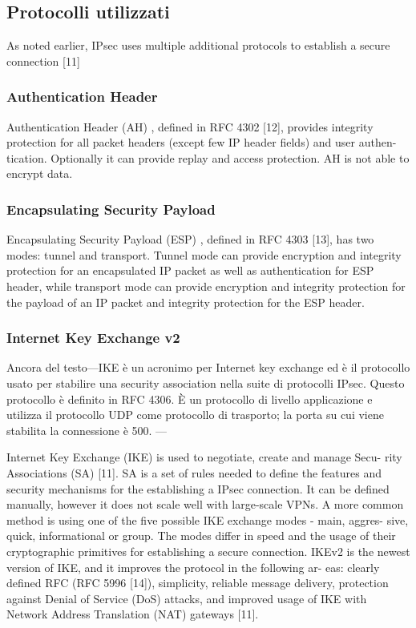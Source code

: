 \subsection{Protocolli utilizzati}
As noted earlier, IPsec uses multiple additional protocols to establish a secure connection [11]

\subsubsection{Authentication Header}
Authentication Header (AH) , defined in RFC 4302 [12], provides integrity protection for all packet headers (except few IP header fields) and user authen- tication. Optionally it can provide replay and access protection. AH is not able to encrypt data.

\subsubsection{Encapsulating Security Payload}
Encapsulating Security Payload (ESP) , defined in RFC 4303 [13], has two modes: tunnel and transport. Tunnel mode can provide encryption and integrity protection for an encapsulated IP packet as well as authentication for ESP header, while transport mode can provide encryption and integrity protection for the payload of an IP packet and integrity protection for the ESP header.

\subsubsection{Internet Key Exchange v2}
Ancora del testo---IKE è un acronimo per Internet key exchange ed è il protocollo usato per stabilire una security association nella suite di protocolli IPsec. Questo protocollo è definito in RFC 4306. È un protocollo di livello applicazione e utilizza il protocollo UDP come protocollo di trasporto; la porta su cui viene stabilita la connessione è 500. ---

Internet Key Exchange (IKE) is used to negotiate, create and manage Secu- rity Associations (SA) [11]. SA is a set of rules needed to define the features and security mechanisms for the establishing a IPsec connection. It can be defined manually, however it does not scale well with large-scale VPNs. A more common method is using one of the five possible IKE exchange modes - main, aggres- sive, quick, informational or group. The modes differ in speed and the usage of their cryptographic primitives for establishing a secure connection. IKEv2 is the newest version of IKE, and it improves the protocol in the following ar- eas: clearly defined RFC (RFC 5996 [14]), simplicity, reliable message delivery, protection against Denial of Service (DoS) attacks, and improved usage of IKE with Network Address Translation (NAT) gateways [11].


